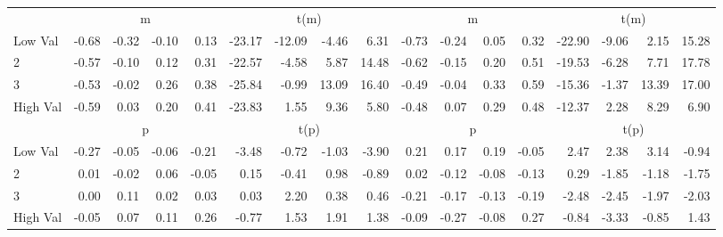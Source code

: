 \begin{tabular}{lrrrrrrrrrrrrrrrr}
  
    
      & \multicolumn{4}{c}{m} & \multicolumn{4}{c}{t(m)}
    
      & \multicolumn{4}{c}{m} & \multicolumn{4}{c}{t(m)}
    
    \\
      \cmidrule(r){2-5} \cmidrule(r){6-9} \cmidrule(r){10-13} \cmidrule(r){14-17}

    Low Val   & -0.68  & -0.32  & -0.10  & 0.13  & -23.17  & -12.09  & -4.46  & 6.31  & -0.73  & -0.24  & 0.05  & 0.32  & -22.90  & -9.06  & 2.15  & 15.28  \\
           2  & -0.57  & -0.10  & 0.12  & 0.31  & -22.57  & -4.58  & 5.87  & 14.48  & -0.62  & -0.15  & 0.20  & 0.51  & -19.53  & -6.28  & 7.71  & 17.78  \\
           3  & -0.53  & -0.02  & 0.26  & 0.38  & -25.84  & -0.99  & 13.09  & 16.40  & -0.49  & -0.04  & 0.33  & 0.59  & -15.36  & -1.37  & 13.39  & 17.00  \\
    High Val  & -0.59  & 0.03  & 0.20  & 0.41  & -23.83  & 1.55  & 9.36  & 5.80  & -0.48  & 0.07  & 0.29  & 0.48  & -12.37  & 2.28  & 8.29  & 6.90  \\

  
    
      & \multicolumn{4}{c}{p} & \multicolumn{4}{c}{t(p)}
    
      & \multicolumn{4}{c}{p} & \multicolumn{4}{c}{t(p)}
    
    \\
      \cmidrule(r){2-5} \cmidrule(r){6-9} \cmidrule(r){10-13} \cmidrule(r){14-17}

    Low Val   & -0.27  & -0.05  & -0.06  & -0.21  & -3.48  & -0.72  & -1.03  & -3.90  & 0.21  & 0.17  & 0.19  & -0.05  & 2.47  & 2.38  & 3.14  & -0.94  \\
           2  & 0.01  & -0.02  & 0.06  & -0.05  & 0.15  & -0.41  & 0.98  & -0.89  & 0.02  & -0.12  & -0.08  & -0.13  & 0.29  & -1.85  & -1.18  & -1.75  \\
           3  & 0.00  & 0.11  & 0.02  & 0.03  & 0.03  & 2.20  & 0.38  & 0.46  & -0.21  & -0.17  & -0.13  & -0.19  & -2.48  & -2.45  & -1.97  & -2.03  \\
    High Val  & -0.05  & 0.07  & 0.11  & 0.26  & -0.77  & 1.53  & 1.91  & 1.38  & -0.09  & -0.27  & -0.08  & 0.27  & -0.84  & -3.33  & -0.85  & 1.43  \\

  

  \bottomrule
\end{tabular}
